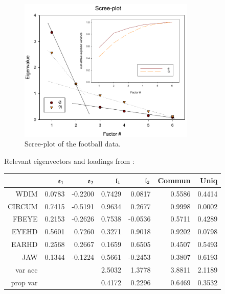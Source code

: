 \begin{figure}
   \caption{Scree-plot of the football data. }
   \label{fig:Scree-football}
   \centering
      \includegraphics[width=0.75\textwidth]{Graphics/Scree-football}
\end{figure}
\vspace{5mm}

Relevant eigenvectors and loadings from :

\begin{tabular}{rrrrrrr}
  \toprule
         & \(\mathfrak{e}_1 \) & \(\mathfrak{e}_2 \) & \(\mathfrak{l}_1 \) & \(\mathfrak{l}_2 \) & Commun & Uniq \\
  \midrule
  WDIM   & 0.0783 & -0.2200 & 0.7429 &  0.0817 & 0.5586 & 0.4414 \\
  CIRCUM & 0.7415 & -0.5191 & 0.9634 &  0.2677 & 0.9998 & 0.0002 \\
  FBEYE  & 0.2153 & -0.2626 & 0.7538 & -0.0536 & 0.5711 & 0.4289 \\
  EYEHD  & 0.5601 &  0.7260 & 0.3271 &  0.9018 & 0.9202 & 0.0798 \\
  EARHD  & 0.2568 &  0.2667 & 0.1659 &  0.6505 & 0.4507 & 0.5493 \\
  JAW    & 0.1344 & -0.1224 & 0.5661 & -0.2453 & 0.3807 & 0.6193 \\
  \midrule
  var acc&        &         & 2.5032 &  1.3778 & 3.8811	& 2.1189 \\
  prop var&       &         & 0.4172 &  0.2296 & 0.6469	& 0.3532 \\
  \bottomrule
\end{tabular}
\vspace{5mm}


